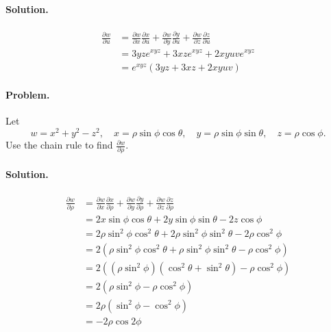 \documentclass[12pt, oneside]{book}
\begin{document}
\paragraph{Solution.}
\begin{align*}
    \frac{\partial w}{\partial u}
    &= \frac{\partial w}{\partial x}\frac{\partial x}{\partial u}
    + \frac{\partial w}{\partial y}\frac{\partial y}{\partial u}
    + \frac{\partial w}{\partial z}\frac{\partial z}{\partial u} \\
    &= 3 yz e^{xyz} + 3 xz e^{xyz} + 2 xyuv e^{xyz} \\
    &= e^{xyz} \left(3 yz + 3 xz + 2 xyuv\right)
\end{align*}

\paragraph{Problem.} Let
\[w = x^2 + y^2 - z^2, \quad x = \rho \sin \phi \cos \theta, \quad y = \rho \sin \phi \sin \theta, \quad z = \rho \cos \phi.\]
Use the chain rule to find \(\frac{\partial w}{\partial \rho}\). \cite{anton-bivens-davis}
\paragraph{Solution.}
\begin{align*}
    \frac{\partial w}{\partial \rho}
    &= \frac{\partial w}{\partial x}\frac{\partial x}{\partial \rho}
    + \frac{\partial w}{\partial y}\frac{\partial y}{\partial \rho}
    + \frac{\partial w}{\partial z}\frac{\partial z}{\partial \rho} \\
    &= 2 x \sin \phi \cos \theta
    + 2 y \sin \phi \sin \theta
    - 2 z \cos \phi \\
    &= 2 \rho \sin ^2 \phi \cos ^2 \theta
    + 2 \rho \sin ^2 \phi \sin ^2 \theta
    - 2 \rho \cos ^2 \phi \\
    &= 2 \left( \rho \sin ^2 \phi \cos ^2 \theta + \rho \sin ^2 \phi \sin ^2 \theta - \rho \cos ^2 \phi \right) \\
    &= 2 \left( \left( \rho \sin ^2 \phi \right) \left( \cos^2 \theta + \sin ^2 \theta \right) - \rho \cos ^2 \phi \right) \\
    &= 2 \left( \rho \sin ^2 \phi - \rho \cos ^2 \phi \right) \\
    &= 2 \rho \left( \sin ^2 \phi - \cos ^2 \phi \right) \\
    &= - 2 \rho \cos 2 \phi
\end{align*}
\end{document}
